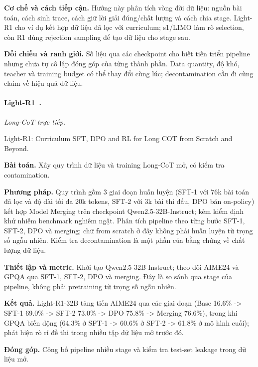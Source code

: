 \noindent\textbf{Cơ chế và cách tiếp cận.} Hướng này phân tích vòng đời dữ liệu: nguồn bài toán, cách sinh trace, cách giữ lời giải đúng/chất lượng và cách chia stage. Light-R1 cho ví dụ kết hợp dữ liệu đã lọc với curriculum; s1/LIMO làm rõ selection, còn R1 dùng rejection sampling để tạo dữ liệu cho stage sau.\par
\noindent\textbf{Đối chiếu và ranh giới.} Số liệu qua các checkpoint cho biết tiến triển pipeline nhưng chưa tự cô lập đóng góp của từng thành phần. Data quantity, độ khó, teacher và training budget có thể thay đổi cùng lúc; decontamination cần đi cùng claim về hiệu quả dữ liệu.\par

\begin{samepage}
\paragraph{Light-R1~\cite{rra1_light_r1}.}
\emph{Long-CoT trực tiếp.}\par
{\raggedright\noindent\small Light-R1: Curriculum SFT, DPO and RL for Long COT from Scratch and Beyond.\par}
\noindent\textbf{Bài toán.} Xây quy trình dữ liệu và training Long-CoT mở, có kiểm tra contamination.\par
\end{samepage}
\noindent\textbf{Phương pháp.} Quy trình gồm 3 giai đoạn huấn luyện (SFT-1 với 76k bài toán đã lọc và độ dài tối đa 20k tokens, SFT-2 với 3k bài thi đấu, DPO bán on-policy) kết hợp Model Merging trên checkpoint Qwen2.5-32B-Instruct; kèm kiểm định khử nhiễm benchmark nghiêm ngặt. Phân tích pipeline theo từng bước SFT-1, SFT-2, DPO và merging; chữ from scratch ở đây không phải huấn luyện từ trọng số ngẫu nhiên. Kiểm tra decontamination là một phần của bằng chứng về chất lượng dữ liệu.\par
\noindent\textbf{Thiết lập và metric.} Khởi tạo Qwen2.5-32B-Instruct; theo dõi AIME24 và GPQA qua SFT-1, SFT-2, DPO và merging. Đây là so sánh qua stage của pipeline, không phải pretraining từ trọng số ngẫu nhiên.\par
\noindent\textbf{Kết quả.} Light-R1-32B tăng tiến AIME24 qua các giai đoạn (Base 16.6\% -> SFT-1 69.0\% -> SFT-2 73.0\% -> DPO 75.8\% -> Merging 76.6\%), trong khi GPQA biến động (64.3\% ở SFT-1 -> 60.6\% ở SFT-2 -> 61.8\% ở mô hình cuối); phát hiện rò rỉ đề thi trong nhiều tập dữ liệu mở trước đó.\par
\noindent\textbf{Đóng góp.} Công bố pipeline nhiều stage và kiểm tra test-set leakage trong dữ liệu mở.\par
